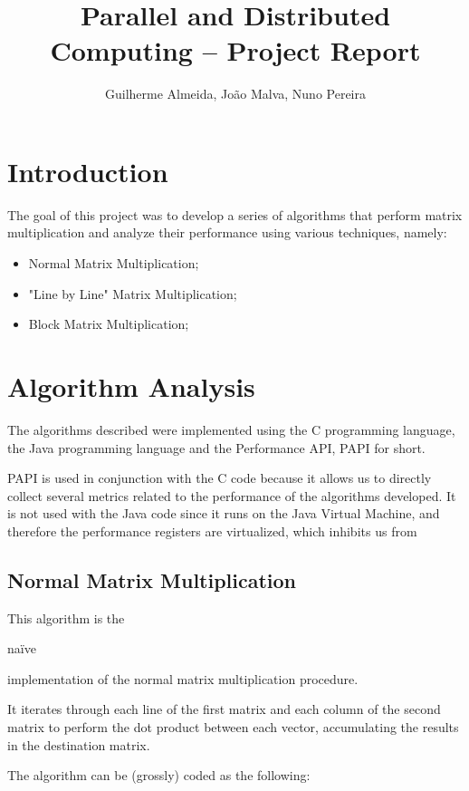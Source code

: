 \documentclass[11pt,a4paper]{article}
\title{Parallel and Distributed Computing -- \nth{1} Project Report}
\author{Guilherme Almeida, João Malva, Nuno Pereira}
\begin{document}
\maketitle

\section{Introduction}

The goal of this project was to develop a series of algorithms that perform matrix multiplication and analyze their performance using various techniques, namely:

\begin{itemize}
    \item Normal Matrix Multiplication;
    \item "Line by Line" Matrix Multiplication;
    \item Block Matrix Multiplication;
\end{itemize}

\section{Algorithm Analysis}

The algorithms described were implemented using the C programming language, the Java programming language and the Performance API, PAPI for short.

PAPI is used in conjunction with the C code because it allows us to directly collect several metrics related to the performance of the algorithms developed.
It is not used with the Java code since it runs on the Java Virtual Machine, and therefore the performance registers are virtualized, which inhibits us from 

\subsection{Normal Matrix Multiplication}

This algorithm is the \begin{em}naïve\end{em} implementation of the normal matrix multiplication procedure.

It iterates through each line of the first matrix and each column of the second matrix to perform the dot product between each vector, accumulating the results in the destination matrix.

The algorithm can be (grossly) coded as the following:
\end{document}
